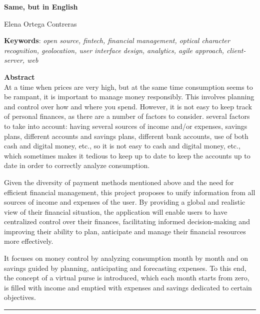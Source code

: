 \cleardoublepage

\begin{center}
	{\large\bfseries Same, but in English}\\
\end{center}
\begin{center}
	Elena Ortega Contreras\\
\end{center}
\vspace{0.5cm}
\noindent\textbf{Keywords}: \textit{open source, fintech, financial management, optical character recognition, geolocation, user interface design, analytics, agile approach, client-server, web}
\vspace{0.7cm}

\noindent\textbf{Abstract}\\
At a time when prices are very high, but at the same time consumption seems to be rampant, it is important to manage money responsibly. This involves planning and control over how and where you spend. However, it is not easy to keep track of personal finances, as there are a number of factors to consider. several factors to take into account: having several sources of income and/or expenses, savings plans, different accounts and savings plans, different bank accounts, use of both cash and digital money, etc., so it is not easy to cash and digital money, etc., which sometimes makes it tedious to keep up to date to keep the accounts up to date in order to correctly analyze consumption.

Given the diversity of payment methods mentioned above and the need for efficient financial management, this project proposes to unify information from all sources of income and expenses of the user. By providing a global and realistic view of their financial situation, the application will enable users to have centralized control over their finances, facilitating informed decision-making and improving their ability to plan, anticipate and manage their financial resources more effectively.

It focuses on money control by analyzing consumption month by month and on savings guided by planning, anticipating and forecasting expenses. To this end, the concept of a virtual purse is introduced, which each month starts from zero, is filled with income and emptied with expenses and savings dedicated to certain objectives. 

\cleardoublepage

\thispagestyle{empty}

\noindent\rule[-1ex]{\textwidth}{2pt}\\[4.5ex]

